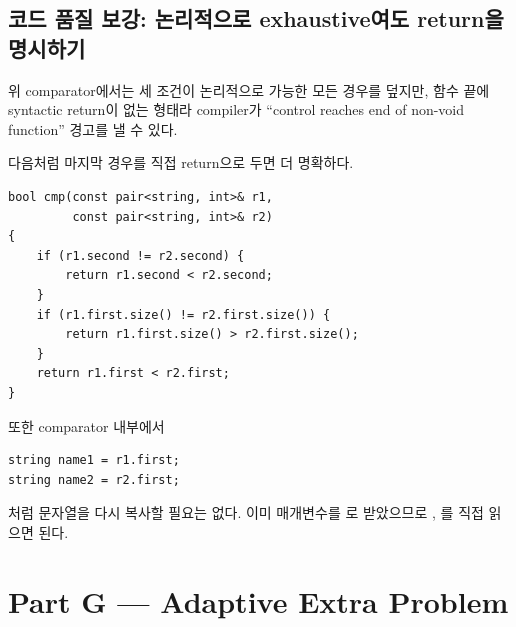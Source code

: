 \subsection{코드 품질 보강: 논리적으로 exhaustive여도 return을 명시하기}
위 comparator에서는 세 조건이 논리적으로 가능한 모든 경우를 덮지만, 함수 끝에 syntactic return이 없는 형태라 compiler가 ``control reaches end of non-void function'' 경고를 낼 수 있다.

다음처럼 마지막 경우를 직접 return으로 두면 더 명확하다.
\begin{lstlisting}
bool cmp(const pair<string, int>& r1,
         const pair<string, int>& r2)
{
    if (r1.second != r2.second) {
        return r1.second < r2.second;
    }
    if (r1.first.size() != r2.first.size()) {
        return r1.first.size() > r2.first.size();
    }
    return r1.first < r2.first;
}
\end{lstlisting}

또한 comparator 내부에서
\begin{lstlisting}
string name1 = r1.first;
string name2 = r2.first;
\end{lstlisting}
처럼 문자열을 다시 복사할 필요는 없다. 이미 매개변수를 로 받았으므로 , 를 직접 읽으면 된다.

\section{Part G --- Adaptive Extra Problem}


